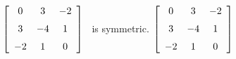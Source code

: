 {$\left[ \begin {array}{ccc} 0&3&-2\\\noalign{\medskip}3&-4&1
\\\noalign{\medskip}-2&1&0\end {array} \right] $} 
{\tta\ is symmetric. $\left[ \begin {array}{ccc} 0&3&-2\\\noalign{\medskip}3&-4&1\\\noalign{\medskip}-2&1&0\end {array} \right] $}


  

